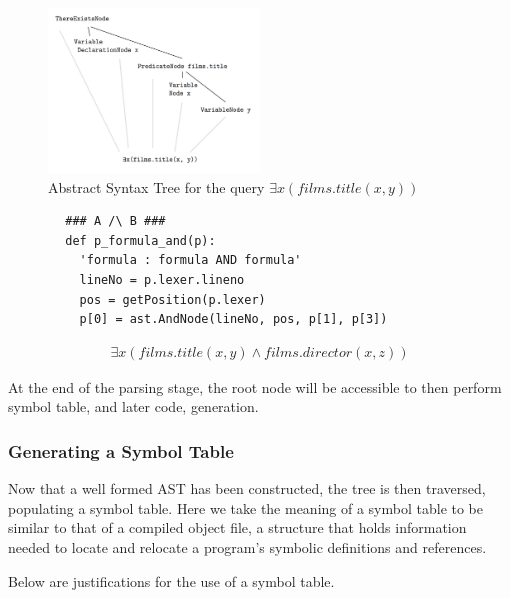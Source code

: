 \documentclass[a4paper, 11pt]{article}
\begin{document}
      \begin{figure}
      \centering
      \includegraphics[width=0.5\textwidth]{images/ASTSimple.png}
      \caption{Abstract Syntax Tree for the query $\exists x(films.title(x, y))$}
      \label{fig:complexAST}
      \end{figure}

      \begin{verbatim}
        ### A /\ B ###
        def p_formula_and(p):
          'formula : formula AND formula'
          lineNo = p.lexer.lineno
          pos = getPosition(p.lexer)
          p[0] = ast.AndNode(lineNo, pos, p[1], p[3])
      \end{verbatim}

      \begin{gather}
        \exists x(films.title(x, y) \land films.director(x, z))
      \end{gather}


      At the end of the parsing stage, the root
      node will be accessible to then perform symbol table, and later code,
      generation.

    \subsubsection{Generating a Symbol Table}

      Now that a well formed AST has been constructed, the tree is then
      traversed, populating a symbol table. Here we take the meaning of a
      symbol table to be similar to that of a compiled object file, a structure
      that holds information needed to locate and relocate a program's symbolic
      definitions and references.\cite{symtab}

      Below are justifications for the use of a symbol table.
\end{document}
